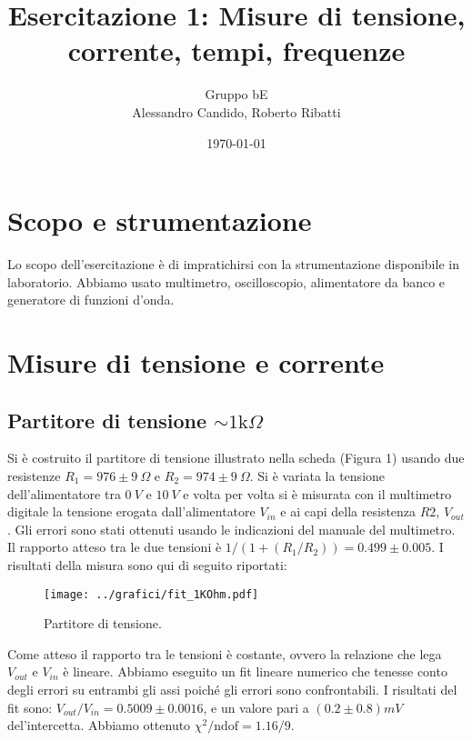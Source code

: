 \documentclass[10pt,a4paper]{article}
\title{Esercitazione 1: Misure di tensione, corrente, tempi, frequenze}
\author{Gruppo bE \\ Alessandro Candido, Roberto Ribatti}
\date{\today}
\begin{document}
\maketitle

\section{Scopo e strumentazione}
Lo scopo dell'esercitazione è di impratichirsi con la strumentazione disponibile in laboratorio. Abbiamo usato multimetro, oscilloscopio, alimentatore da banco e generatore di funzioni d'onda.

\section{Misure di tensione e corrente}

\subsection{Partitore di tensione $\sim1\text{k}\Omega$}
Si è costruito il partitore di tensione illustrato nella scheda (Figura 1) usando due resistenze $R_1 = 976 \pm 9~\Omega$ e $R_2 = 974 \pm 9 ~\Omega$.
Si è variata la tensione dell'alimentatore tra $0~V$ e $10~V$ e volta per volta si è misurata con il multimetro digitale la tensione erogata dall'alimentatore $V_{in}$ e ai capi della resistenza $R2$, $V_{out}$. Gli errori sono stati ottenuti usando le indicazioni del manuale del multimetro.
Il rapporto atteso tra le due tensioni è $1/(1+(R_1/R_2))=0.499 \pm 0.005$. 
I risultati della misura sono qui di seguito riportati:

\begin{figure}[h]
\centering
\begin{minipage}[b]{.6\textwidth}
	\centering
	\texttt{[image: ../grafici/fit\_1KOhm.pdf]}
	\caption{Partitore di tensione.}
	\label{f:par1}
\end{minipage}\hfill
\begin{minipage}[b]{.35\textwidth}
	\centering
	
	\label{...}
\end{minipage}\hspace*{\fill}
\end{figure}


Come atteso il rapporto tra le tensioni è costante, ovvero la relazione che lega $V_{out}$ e $V_{in}$ è lineare.
Abbiamo eseguito un fit lineare numerico che tenesse conto degli errori su entrambi gli assi poiché gli errori sono confrontabili. I risultati del fit sono: $V_{out}/V_{in}=0.5009 \pm 0.0016$, e un valore pari a $(0.2\pm 0.8) mV$ del'intercetta. Abbiamo ottenuto  $\chi^2/\text{ndof}= 1.16/9$.
\end{document}
